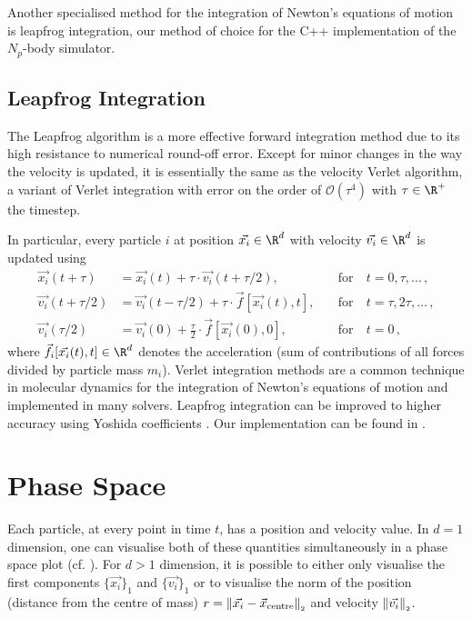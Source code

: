 Another specialised method for the integration of Newton's equations of motion is leapfrog integration, our method of choice for the C++ implementation of the $N_p$-body simulator.

\subsection{Leapfrog Integration}
The Leapfrog algorithm is a more effective forward integration method due to its high resistance to numerical round-off error.
Except for minor changes in the way the velocity is updated, it is essentially the same as the velocity Verlet algorithm, a variant of Verlet integration with error on the order of $\mathcal{O}(\tau^4)$ with $\tau \in \R^+$ the timestep.

In particular, every particle $i$ at position $\vec{x_i} \in \R^d$ with velocity $\vec{v_i} \in \R^d$ is updated using
\begin{align*}
  \vec{x_i}(t+\tau)     & = \vec{x_i}(t)+\tau \cdot \vec{v_i}(t+\tau / 2),              & \quad\text{for}~ & t=0, \tau, \ldots\,,      \\
  \vec{v_i}(t+\tau / 2) & = \vec{v_i}(t-\tau/2) + \tau \cdot \vec{f}[\vec{x_i}(t), t],  & \quad\text{for}~ & t=\tau, 2 \tau, \ldots\,, \\
  \vec{v_i}(\tau / 2)   & = \vec{v_i}(0)+\frac{\tau}{2} \cdot \vec{f}[\vec{x_i}(0), 0], & \quad\text{for}~ & t=0\,,
\end{align*}
where $\vec{f_i}[\vec{x_i}(t), t] \in \R^d$ denotes the acceleration (sum of contributions of all forces divided by particle mass $m_i$).
Verlet integration methods are a common technique in molecular dynamics for the integration of Newton's equations of motion and implemented in many solvers.
Leapfrog integration can be improved to higher accuracy using Yoshida coefficients \parencite{1973-yoshida-coefficients}.
Our implementation can be found in .


\section{Phase Space}
Each particle, at every point in time $t$, has a position and velocity value.
In $d=1$ dimension, one can visualise both of these quantities simultaneously in a phase space plot (cf. ).
For $d > 1$ dimension, it is possible to either only visualise the first components $\{\vec{x_i}\}_1$ and $\{\vec{v_i}\}_1$ or to visualise the norm of the position (distance from the centre of mass) $r = \left\lVert\vec{x_i} - \vec{x}_{\text{centre}}\right\rVert_{\scriptscriptstyle 2}$ and velocity $\left\lVert\vec{v_i}\right\rVert_{\scriptscriptstyle 2}$.

